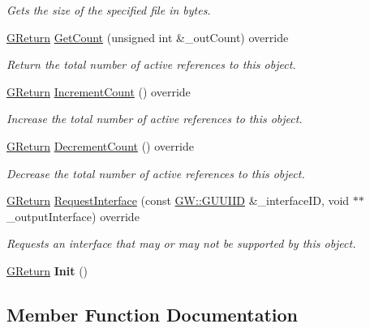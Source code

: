 \begin{DoxyCompactItemize}
\begin{DoxyCompactList}\small\item\em Gets the size of the specified file in bytes. \end{DoxyCompactList}\item 
\hyperlink{namespaceGW_a67a839e3df7ea8a5c5686613a7a3de21}{G\+Return} \hyperlink{classFileIO_a20566e320ec4cc0d5615bc3bc1fa3013}{Get\+Count} (unsigned int \&\+\_\+out\+Count) override
\begin{DoxyCompactList}\small\item\em Return the total number of active references to this object. \end{DoxyCompactList}\item 
\hyperlink{namespaceGW_a67a839e3df7ea8a5c5686613a7a3de21}{G\+Return} \hyperlink{classFileIO_a9f2c9a4d13577e14a2c94b0e9617d80b}{Increment\+Count} () override
\begin{DoxyCompactList}\small\item\em Increase the total number of active references to this object. \end{DoxyCompactList}\item 
\hyperlink{namespaceGW_a67a839e3df7ea8a5c5686613a7a3de21}{G\+Return} \hyperlink{classFileIO_ab7e4806ca819c3fcdeeb40a2af5f0298}{Decrement\+Count} () override
\begin{DoxyCompactList}\small\item\em Decrease the total number of active references to this object. \end{DoxyCompactList}\item 
\hyperlink{namespaceGW_a67a839e3df7ea8a5c5686613a7a3de21}{G\+Return} \hyperlink{classFileIO_a3fb39527fac479474c6ef5045dbc1551}{Request\+Interface} (const \hyperlink{structGW_1_1GUUIID}{G\+W\+::\+G\+U\+U\+I\+ID} \&\+\_\+interface\+ID, void $\ast$$\ast$\+\_\+output\+Interface) override
\begin{DoxyCompactList}\small\item\em Requests an interface that may or may not be supported by this object. \end{DoxyCompactList}\item 
\hyperlink{namespaceGW_a67a839e3df7ea8a5c5686613a7a3de21}{G\+Return} {\bfseries Init} ()\hypertarget{classFileIO_a1c24bf6f35d30462fd918e5ee1a44033}{}\label{classFileIO_a1c24bf6f35d30462fd918e5ee1a44033}

\end{DoxyCompactItemize}


\subsection{Member Function Documentation}
